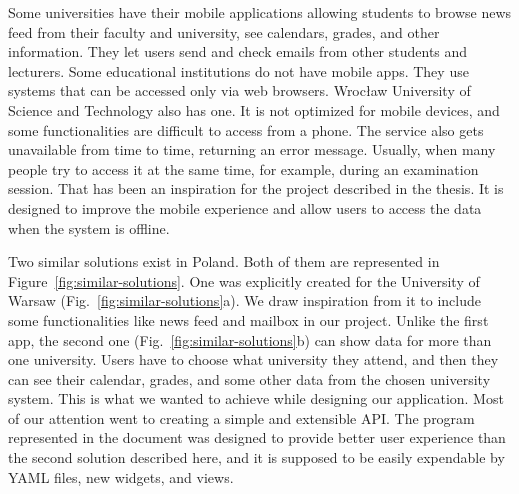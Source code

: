 Some universities have their mobile applications allowing students to browse news feed from their faculty and university, see calendars, grades, and other information. They let users send and check emails from other students and lecturers. Some educational institutions do not have mobile apps. They use systems that can be accessed only via web browsers. Wrocław University of Science and Technology also has one. It is not optimized for mobile devices, and some functionalities are difficult to access from a phone. The service also gets unavailable from time to time, returning an error message. Usually, when many people try to access it at the same time, for example, during an examination session. That has been an inspiration for the project described in the thesis. It is designed to improve the mobile experience and allow users to access the data when the system is offline.


Two similar solutions exist in Poland. Both of them are represented in Figure~\ref{fig:similar-solutions}. One was explicitly created for the University of Warsaw (Fig.~\ref{fig:similar-solutions}a). We draw inspiration from it to include some functionalities like news feed and mailbox in our project. Unlike the first app, the second one (Fig.~\ref{fig:similar-solutions}b) can show data for more than one university. Users have to choose what university they attend, and then they can see their calendar, grades, and some other data from the chosen university system. This is what we wanted to achieve while designing our application. Most of our attention went to creating a simple and extensible API. The program represented in the document was designed to provide better user experience than the second solution described here, and it is supposed to be easily expendable by YAML files, new widgets, and views.

